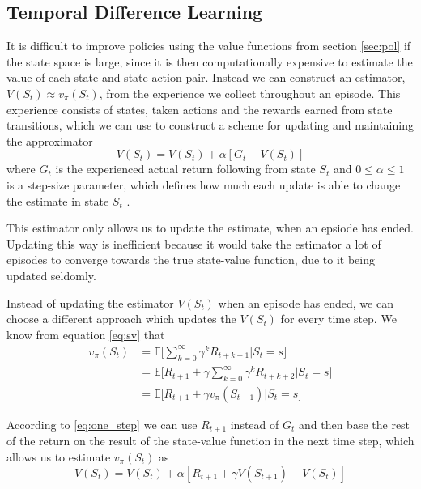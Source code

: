 \documentclass[11pt]{article}
\begin{document}
\maketitle

\subsection{Temporal Difference Learning}

It is difficult to improve policies using the value functions from
section \ref{sec:pol} if the state space is large, since it is then
computationally expensive to estimate the value of each state and
state-action pair.
Instead we can construct an estimator, $V(S_{t}) \approx v_\pi(S_t)$,
from the experience we collect throughout an episode.
This experience consists of states, taken actions and the rewards
earned from state transitions, which we can use to construct
a scheme for updating and maintaining the approximator
\begin{equation}
    V(S_t) = V(S_t) + \alpha [G_t - V(S_t)]
\end{equation}
where $G_t$ is the experienced actual return following from state
$S_t$ and $0 \leq \alpha \leq 1$ is a step-size parameter, 
which defines how much each update is able to change the estimate
in state $S_t$ \cite{RLbook}.

This estimator only allows us to update the estimate, when an epsiode
has ended.
Updating this way is inefficient because it would take the estimator
a lot of episodes to converge towards the true state-value function,
due to it being updated seldomly. 

Instead of updating the estimator $V(S_t)$ when an episode has
ended, we can choose a different approach which updates the $V(S_t)$
for every time step.
We know from equation \ref{eq:sv} that
\begin{equation}\label{eq:one_step}
    \begin{aligned}
        v_\pi(S_t) & = \mathds{E}\bigg[\sum\limits_{k=0}^\infty \gamma^k  R_{t+k+1} \bigg| S_t = s\bigg] \\
                   & = \mathds{E}\bigg[R_{t+1} + \gamma  \sum\limits_{k=0}^\infty \gamma^k  R_{t+k+2} \bigg| S_t = s\bigg] \\
                   & = \mathds{E}\bigg[R_{t+1} + \gamma  v_\pi(S_{t+1}) \bigg| S_t = s\bigg]
    \end{aligned}
\end{equation}

According to \ref{eq:one_step} we can use $R_{t+1}$ instead of $G_t$
and then base the rest of the return on the result of the state-value
function in the next time step, which allows us to estimate $v_\pi(S_t)$ as
\begin{equation}
    V(S_t) = V(S_t) + \alpha  [R_{t+1} + \gamma  V(S_{t+1}) - V(S_t)]
\end{equation}
\end{document}
